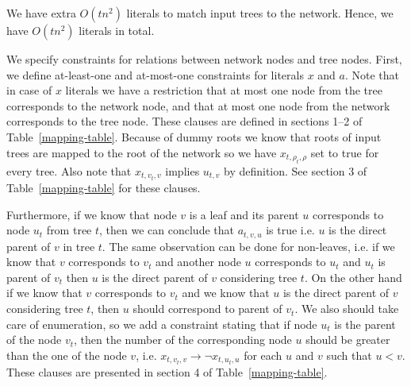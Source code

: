 \documentclass[runningheads, envcountsame, a4paper]{llncs}
\begin{document}
We have extra $O(tn^2)$ literals to match input trees to the network. Hence, we have $O(tn^2)$ literals in total.

We specify constraints for relations between network nodes and tree nodes. 
First, we define at-least-one and at-most-one constraints for literals $x$ and $a$. Note that in case 
of $x$ literals we have a restriction that at most one node from the tree corresponds to the network node, and that at 
most one node from the network corresponds to the tree node. These clauses are defined in sections 1--2 of Table~\ref{mapping-table}.
Because of dummy roots we know that roots of input trees 
are mapped to the root of the network so we have $x_{t,\rho_t,\rho}$ set to true for every tree. Also 
note that $x_{t,v_t,v}$ implies $u_{t,v}$ by definition. See section 3 of Table~\ref{mapping-table} for these clauses.

Furthermore, if we know that node $v$ is a leaf and its parent $u$ corresponds to node $u_t$ from tree $t$, 
then we can conclude that $a_{t,v,u}$ is true i.e. $u$ is the direct parent of $v$ in tree $t$. The same observation 
can be done for non-leaves, i.e. if we know that $v$ corresponds to $v_t$ and another node $u$ corresponds to $u_t$ 
and $u_t$ is parent of $v_t$ then $u$ is the direct parent of $v$ considering tree $t$. On the other hand if we know 
that $v$ corresponds to $v_t$ and we know that $u$ is the direct parent of $v$ considering tree $t$, then $u$ should 
correspond to parent of $v_t$. We also should take care of enumeration, so we add a constraint stating that if node 
$u_t$ is the parent of the node $v_t$, then the number of the corresponding node $u$ should be greater than the one of 
the node $v$, i.e. $x_{t,v_t,v} \rightarrow \neg x_{t,u_t,u}$ for each $u$ and $v$ such that $u < v$. These clauses are
presented in section 4 of Table~\ref{mapping-table}.
\end{document}
